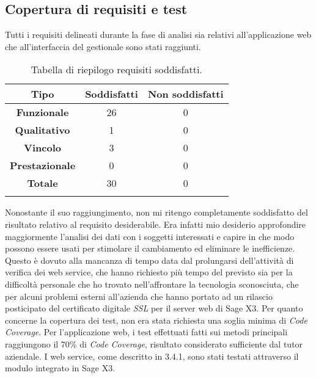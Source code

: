 
\subsection{Copertura di requisiti e test}

Tutti i requisiti delineati durante la fase di analisi sia relativi all'applicazione web che all'interfaccia del gestionale sono stati raggiunti.

\begin{center}
	\begin{longtable}{ | c| c | c|}
		\hline
		\textbf{Tipo} & \textbf{Soddisfatti} & \textbf{Non soddisfatti} \\
		\hline
		\textbf{Funzionale} & 26 & 0 \\
		\hline
		\textbf{Qualitativo} & 1 & 0 \\
		\hline
		\textbf{Vincolo} & 3 & 0 \\
		\hline
		\textbf{Prestazionale} & 0 & 0 \\
		\hline
		\textbf{Totale} & 30 & 0 \\
		\hline
		\caption{Tabella di riepilogo requisiti soddisfatti.}
	\end{longtable}
\end{center}

Nonostante il suo raggiungimento, non mi ritengo completamente soddisfatto del risultato relativo al requisito desiderabile. Era infatti mio desiderio approfondire maggiormente l'analisi dei dati con i soggetti interessati e capire in che modo possono essere usati per stimolare il cambiamento ed eliminare le inefficienze.
Questo è dovuto alla mancanza di tempo data dal prolungarsi dell'attività di verifica dei web service, che hanno richiesto più tempo del previsto sia per la difficoltà personale che ho trovato nell'affrontare la tecnologia sconosciuta, che per alcuni problemi esterni all'azienda che hanno portato ad un rilascio posticipato del certificato digitale \textit{SSL} per il server web di Sage X3.
Per quanto concerne la copertura dei test, non era stata richiesta una soglia minima di \textit{Code Coverage}. Per l'applicazione web, i test effettuati fatti sui metodi principali raggiungono il 70\% di \textit{Code Coverage}, risultato considerato sufficiente dal tutor aziendale.
I web service, come descritto in 3.4.1, sono stati testati attraverso il modulo integrato in Sage X3.


